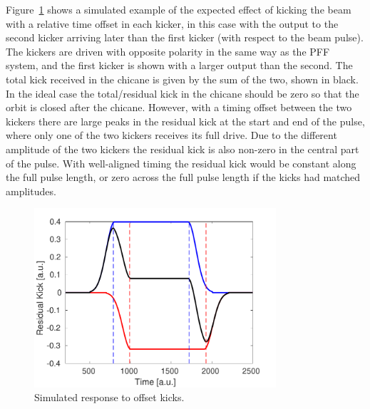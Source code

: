 Figure~\ref{f:relDelay_sim} shows a simulated example of the expected effect of kicking the beam with a relative time offset in each kicker, in this case with the output to the second kicker arriving later than the first kicker (with respect to the beam pulse). The kickers are driven with opposite polarity in the same way as the PFF system, and the first kicker is shown with a larger output than the second. The total kick received in the chicane is given by the sum of the two, shown in black. In the ideal case the total/residual kick in the chicane should be zero so that the orbit is closed after the chicane. However, with a timing offset between the two kickers there are large peaks in the residual kick at the start and end of the pulse, where only one of the two kickers receives its full drive. Due to the different amplitude of the two kickers the residual kick is also non-zero in the central part of the pulse. With well-aligned timing the residual kick would be constant along the full pulse length, or zero across the full pulse length if the kicks had matched amplitudes.

\begin{figure}
  \centering
  \includegraphics[width=0.8\textwidth]{Figures/commissioning/relDelay_sim}
  \caption{Simulated response to offset kicks.}
  \label{f:relDelay_sim}
\end{figure}

